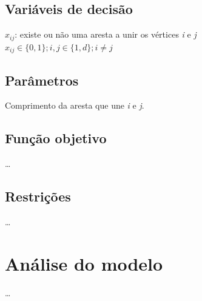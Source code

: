 \documentclass{article}
\begin{document}
\subsection{Variáveis de decisão}

\(x_{ij}\): existe ou não uma aresta a unir os vértices \emph{i} e \emph{j}\\
\(x_{ij} \in \{ 0,1 \}; i, j \in \{ 1, d \}; i \neq j \)

\subsection{Parâmetros}

Comprimento da aresta que une \emph{i} e \emph{j}.

\subsection{Função objetivo}

\dots

\subsection{Restrições}

\dots

\section{Análise do modelo}

\dots
\end{document}
